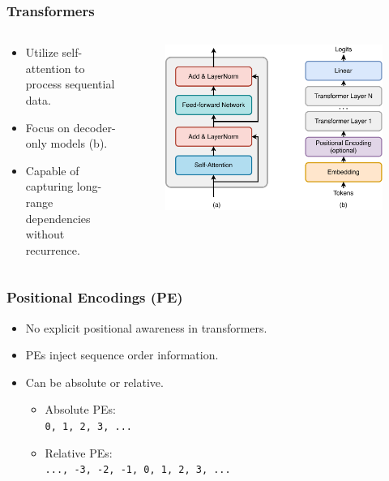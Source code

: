 \documentclass[14pt,aspectratio=169]{beamer}
\theoremstyle{remark}
\begin{document}
\begin{frame}
    \frametitle{Transformers}
    \begin{columns}
        \begin{column}{0.6\textwidth}
            \begin{itemize}
                \item Utilize self-attention to process sequential data.
                \item Focus on decoder-only models (b).
                \item Capable of capturing long-range dependencies without recurrence.
            \end{itemize}
        \end{column}
        \begin{column}{0.4\textwidth}
            \begin{figure}
                \centering
                \includegraphics[width=\textwidth]{fig/transformer_layer.pdf}
            \end{figure}
        \end{column}
    \end{columns}
\end{frame}

\begin{frame}
    \frametitle{Positional Encodings (PE)}
    \begin{itemize}
        \item No explicit positional awareness in transformers.
        \item PEs inject sequence order information.
        \item Can be absolute or relative.
              \begin{itemize}
                  \item Absolute PEs: \\ \texttt{0, 1, 2, 3, ...}
                  \item Relative PEs: \\ \texttt{..., -3, -2, -1, 0, 1, 2, 3, ...}
              \end{itemize}
    \end{itemize}
\end{frame}
\end{document}
